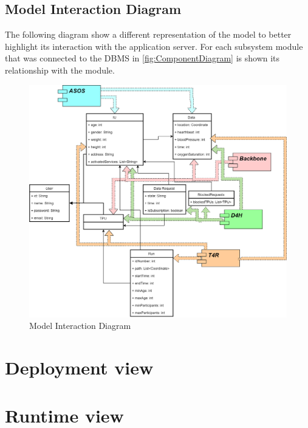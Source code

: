 \subsection{Model Interaction Diagram}
The following diagram show a different representation of the model to better highlight its interaction with the application server. For each subsystem module that was connected to the DBMS in \ref{fig:ComponentDiagram} is shown its relationship with the module. 
\begin{figure}[H]
\caption{Model Interaction Diagram}
\centering
\includegraphics[width = \textwidth]{sections/architecturalDesign/modelInteractionDiagram.png}
\end{figure}
\clearpage
\section{Deployment view}
\section{Runtime view}
